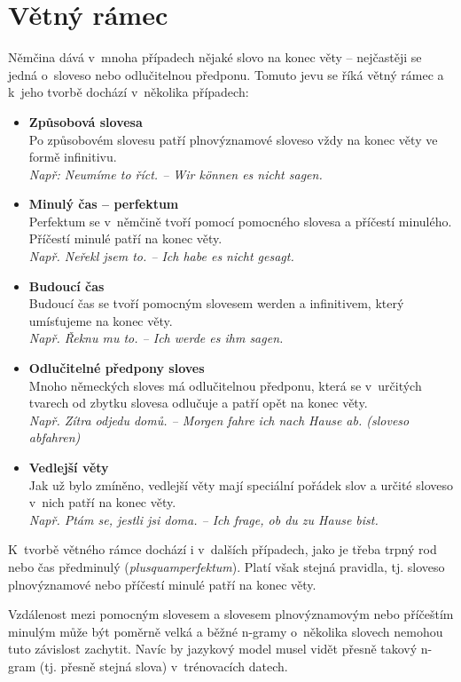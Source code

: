 \documentclass[12pt,a4paper]{report}
\begin{document}
\section{Větný rámec}
Němčina dává v~mnoha případech nějaké slovo na konec věty -- nejčastěji se jedná o~sloveso nebo odlučitelnou předponu. Tomuto jevu se říká větný rámec a k~jeho tvorbě dochází v~několika případech:
\begin{itemize}
\item
\textbf{Způsobová slovesa}\\
Po způsobovém slovesu patří plnovýznamové sloveso vždy na konec věty ve formě infinitivu. \\
\textit{Např: Neumíme to říct. -- Wir können es nicht sagen.}
\item
\textbf{Minulý čas -- perfektum}\\
Perfektum se v~němčině tvoří pomocí pomocného slovesa a příčestí minulého. Příčestí minulé patří na konec věty.\\
\textit{Např. Neřekl jsem to. -- Ich habe es nicht gesagt.}
\item
\textbf{Budoucí čas} \\
Budoucí čas se tvoří pomocným slovesem werden a infinitivem, který umísťujeme na konec věty.\\
\textit{Např. Řeknu mu to. -- Ich werde es ihm sagen.}
\item
\textbf{Odlučitelné předpony sloves}\\
Mnoho německých sloves má odlučitelnou předponu, která se v~určitých tvarech od zbytku slovesa odlučuje a patří opět na konec věty.\\
\textit{Např. Zítra odjedu domů. -- Morgen fahre ich nach Hause ab. (sloveso abfahren)}
\item
\textbf{Vedlejší věty}\\
Jak už bylo zmíněno, vedlejší věty mají speciální pořádek slov a určité sloveso v~nich patří na konec věty.\\
\textit{Např. Ptám se, jestli jsi doma. -- Ich frage, ob du zu Hause bist.}
\end{itemize}

K~tvorbě větného rámce dochází i v~dalších případech, jako je třeba trpný rod nebo čas předminulý (\textit{plusquamperfektum}). Platí však stejná pravidla, tj. sloveso plnovýznamové nebo příčestí minulé patří na konec věty.

Vzdálenost mezi pomocným slovesem a slovesem plnovýznamovým nebo příčeštím minulým může být poměrně velká a běžné n-gramy o~několika slovech nemohou tuto závislost zachytit. Navíc by jazykový model musel vidět přesně takový n-gram (tj. přesně stejná slova) v~trénovacích datech.
\end{document}
